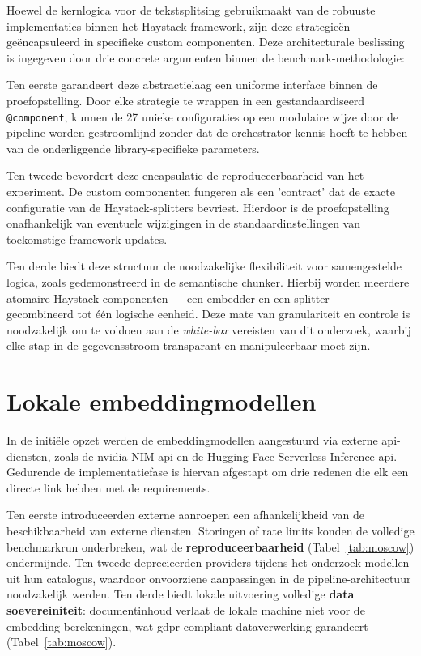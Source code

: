 Hoewel de kernlogica voor de tekstsplitsing gebruikmaakt van de robuuste implementaties binnen het Haystack-framework, zijn deze strategieën geëncapsuleerd in specifieke custom componenten. Deze architecturale beslissing is ingegeven door drie concrete argumenten binnen de benchmark-methodologie:

Ten eerste garandeert deze abstractielaag een uniforme interface binnen de proefopstelling. Door elke strategie te wrappen in een gestandaardiseerd \texttt{@component}, kunnen de 27 unieke configuraties op een modulaire wijze door de pipeline worden gestroomlijnd zonder dat de orchestrator kennis hoeft te hebben van de onderliggende library-specifieke parameters.

Ten tweede bevordert deze encapsulatie de reproduceerbaarheid van het experiment. De custom componenten fungeren als een 'contract' dat de exacte configuratie van de Haystack-splitters bevriest. Hierdoor is de proefopstelling onafhankelijk van eventuele wijzigingen in de standaardinstellingen van toekomstige framework-updates.

Ten derde biedt deze structuur de noodzakelijke flexibiliteit voor samengestelde logica, zoals gedemonstreerd in de semantische chunker. Hierbij worden meerdere atomaire Haystack-componenten — een embedder en een splitter — gecombineerd tot één logische eenheid. Deze mate van granulariteit en controle is noodzakelijk om te voldoen aan de \emph{white-box} vereisten van dit onderzoek, waarbij elke stap in de gegevensstroom transparant en manipuleerbaar moet zijn.

\section{Lokale embeddingmodellen}
\label{sec:lokale-embedding}

In de initiële opzet werden de embeddingmodellen aangestuurd via externe \gls{api}-diensten, zoals de \gls{nvidia} NIM \gls{api} en de Hugging Face Serverless Inference \gls{api}. Gedurende de implementatiefase is hiervan afgestapt om drie redenen die elk een directe link hebben met de requirements.

Ten eerste introduceerden externe aanroepen een afhankelijkheid van de beschikbaarheid van externe diensten. Storingen of rate limits konden de volledige benchmarkrun onderbreken, wat de \textbf{reproduceerbaarheid} (Tabel~\ref{tab:moscow}) ondermijnde. Ten tweede deprecieerden providers tijdens het onderzoek modellen uit hun catalogus, waardoor onvoorziene aanpassingen in de pipeline-architectuur noodzakelijk werden. Ten derde biedt lokale uitvoering volledige \textbf{data soevereiniteit}: documentinhoud verlaat de lokale machine niet voor de embedding-berekeningen, wat \gls{gdpr}-compliant dataverwerking garandeert (Tabel~\ref{tab:moscow}).

